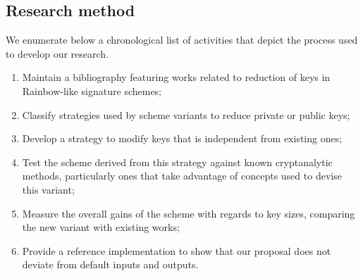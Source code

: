 \documentclass[draft, 12pt, a4paper, oneside]{memoir}
\begin{document}
\subsection{Research method}

We enumerate below a chronological list of activities that depict the process used to develop our research.

\begin{enumerate}[label=(\roman*), itemsep=1pt]
    \item Maintain a bibliography featuring works related to reduction of keys in Rainbow-like signature schemes;
    \item Classify strategies used by scheme variants to reduce private or public keys;
    \item Develop a strategy to modify keys that is independent from existing ones;
    \item Test the scheme derived from this strategy against known cryptanalytic methods, particularly ones that take advantage of concepts used to devise this variant;
    \item Measure the overall gains of the scheme with regards to key sizes, comparing the new variant with existing works;
    \item Provide a reference implementation to show that our proposal does not deviate from default inputs and outputs.
\end{enumerate}



\end{document}
